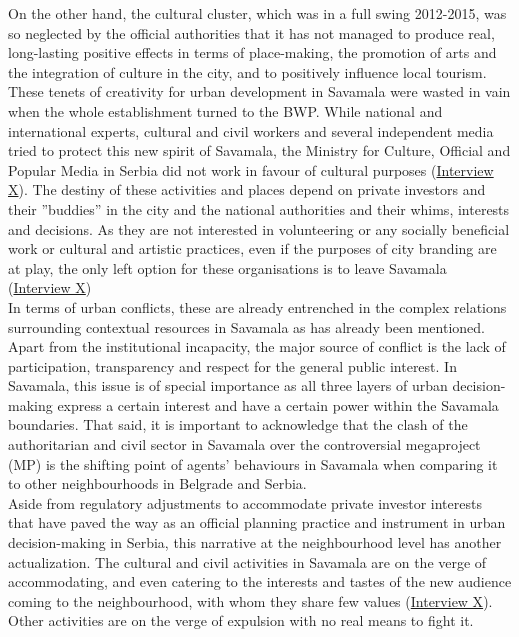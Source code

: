 \documentclass[11pt]{report}
\begin{document}
{{{On the other hand, the cultural cluster, which was in a full swing 2012-2015, was so neglected by the official authorities that it has not managed to produce real, long-lasting positive effects in terms of place-making, the promotion of arts and the integration of culture in the city, and to positively influence local tourism. These tenets of creativity for urban development in Savamala were wasted in vain when the whole establishment turned to the BWP.
While national and international experts, cultural and civil workers and several independent media tried to protect this new spirit of Savamala, the Ministry for Culture, Official and Popular Media in Serbia did not work in favour of cultural purposes
(\href{InterviewX}{Interview X}).
The destiny of these activities and places depend on private investors and their ”buddies” in the city and the national authorities and their whims, interests and decisions. As they are not interested in volunteering or any socially beneficial work or cultural and artistic practices, even if the purposes of city branding are at play, the only left option for these organisations is to leave Savamala
(\href{InterviewX}{Interview X})
\\

In terms of urban conflicts, these are already entrenched in the complex relations surrounding contextual resources in Savamala as has  already been mentioned. Apart from the institutional incapacity, the major source of conflict is the lack of participation, transparency and respect for the general public interest. In Savamala, this issue is of special importance as all three layers of urban decision-making express a certain interest and have a certain power within the Savamala boundaries. That said, it is important to acknowledge that the clash of the authoritarian and civil sector in Savamala over the controversial megaproject (MP) is the shifting point of agents’ behaviours in Savamala when comparing it to other neighbourhoods in Belgrade and Serbia.
\\

Aside from regulatory adjustments to accommodate private investor interests that have paved the way as an official planning practice and instrument in urban decision-making in Serbia, this narrative at the neighbourhood level has another actualization. The cultural and civil activities in Savamala are on the verge of accommodating, and even catering to the interests and tastes of the new audience coming to the neighbourhood, with whom they share few values 
(\href{InterviewX}{Interview X}).
Other activities are on the verge of expulsion with no real means to fight it. 
\\

}}}
\end{document}
